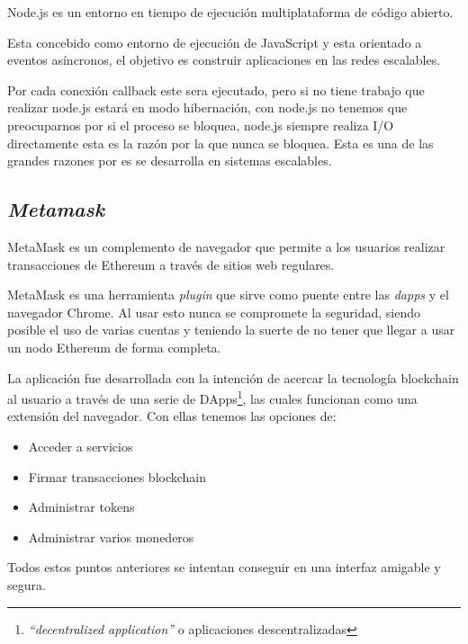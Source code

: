 Node.js\cite{node}\cite{node1} es un entorno en tiempo de ejecución multiplataforma de código abierto.

Esta concebido como entorno de ejecución de JavaScript y esta orientado a eventos asíncronos, el objetivo es construir aplicaciones en las redes escalables. 

Por cada conexión callback este sera ejecutado, pero si no tiene trabajo que realizar node.js estará en modo hibernación, con node.js no tenemos que preocuparnos por si el proceso se bloquea, node.js siempre realiza I/O directamente esta es la razón por la que nunca se bloquea. Esta es una de las grandes razones por es se desarrolla en sistemas escalables.


\subsection{\textit{Metamask}}

MetaMask\cite{metamask} es un complemento de navegador que permite a los usuarios realizar transacciones de Ethereum a través de sitios web regulares.

MetaMask\cite{metamask1} es una herramienta \textit{plugin} que sirve como puente entre las \textit{dapps} y el navegador Chrome. Al usar esto nunca se compromete la seguridad, siendo posible el uso de varias cuentas y teniendo la suerte de no tener que llegar a usar un nodo Ethereum de forma completa.

La aplicación fue desarrollada con la intención de acercar la tecnología blockchain al usuario a través de una serie de DApps\footnote{\textit{``decentralized application''} o aplicaciones descentralizadas}, las cuales funcionan como una extensión del navegador. Con ellas tenemos las opciones de:
\begin{itemize}
	\item Acceder a servicios
	\item Firmar transacciones blockchain
	\item Administrar tokens
	\item Administrar varios monederos
\end{itemize}

Todos estos puntos anteriores se intentan conseguir en una interfaz amigable y segura. 

